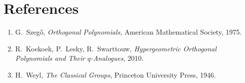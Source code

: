 \documentclass[11pt]{article}
\begin{document}
\section*{References}
\begin{enumerate}
  \item G.~Szeg\H{o}, \emph{Orthogonal Polynomials}, American Mathematical Society, 1975.
  \item R.~Koekoek, P.~Lesky, R.~Swarttouw, \emph{Hypergeometric Orthogonal Polynomials and Their $q$-Analogues}, 2010.
  \item H.~Weyl, \emph{The Classical Groups}, Princeton University Press, 1946.
\end{enumerate}
\end{document}
